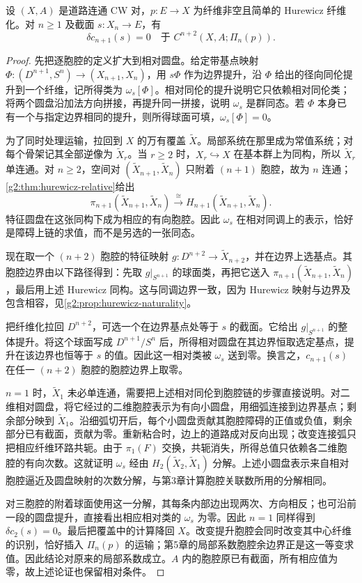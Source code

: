 \begin{lemma}\label{g2:lem:obstruction-cocycle}
	设 \((X,A)\) 是道路连通 CW 对，\(p:E\to X\) 为纤维非空且简单的 Hurewicz 纤维化。对 \(n\ge1\) 及截面 \(s:X_n\to E\)，有
	\[
		\delta c_{n+1}(s)=0\quad\text{于 }C^{n+2}(X,A;\Pi_n(p)).
	\]
\end{lemma}
\begin{proof}
	先把逐胞腔的定义扩大到相对圆盘。给定带基点映射 \(\Phi:(D^{n+1},S^n)\to(X_{n+1},X_n)\)，用 \(s\Phi\) 作为边界提升，沿 \(\Phi\) 给出的径向同伦提升到一个纤维，记所得类为 \(\omega_s[\Phi]\)。相对同伦的提升说明它只依赖相对同伦类；将两个圆盘沿加法方向拼接，再提升同一拼接，说明 \(\omega_s\) 是群同态。若 \(\Phi\) 本身已有一个与指定边界相同的提升，则所得球面可填，\(\omega_s[\Phi]=0\)。

	为了同时处理运输，拉回到 \(X\) 的万有覆盖 \(\widetilde X\)。局部系统在那里成为常值系统；对每个骨架记其全部逆像为 \(\widetilde X_r\)。当 \(r\ge2\) 时，\(X_r\hookrightarrow X\) 在基本群上为同构，所以 \(\widetilde X_r\) 单连通。对 \(n\ge2\)，空间对 \((\widetilde X_{n+1},\widetilde X_n)\) 只附着 \((n+1)\) 胞腔，故为 \(n\) 连通；\cref{g2:thm:hurewicz-relative}给出
	\[
		\pi_{n+1}(\widetilde X_{n+1},\widetilde X_n)\xrightarrow{\cong}
		H_{n+1}(\widetilde X_{n+1},\widetilde X_n).
	\]
	特征圆盘在这张同构下成为相应的有向胞腔。因此 \(\omega_s\) 在相对同调上的表示，恰好是障碍上链的求值，而不是另选的一张同态。

	现在取一个 \((n+2)\) 胞腔的特征映射 \(g:D^{n+2}\to\widetilde X_{n+2}\)，并在边界上选基点。其胞腔边界由以下路径得到：先取 \(g|_{S^{n+1}}\) 的球面类，再把它送入 \(\pi_{n+1}(\widetilde X_{n+1},\widetilde X_n)\)，最后用上述 Hurewicz 同构。这与同调边界一致，因为 Hurewicz 映射与边界及包含相容，见\cref{g2:prop:hurewicz-naturality}。

	把纤维化拉回 \(D^{n+2}\)，可选一个在边界基点处等于 \(s\) 的截面。它给出 \(g|_{S^{n+1}}\) 的整体提升。将这个球面写成 \(D^{n+1}/S^n\) 后，所得相对圆盘在其边界恒取选定基点，提升在该边界也恒等于 \(s\) 的值。因此这一相对类被 \(\omega_s\) 送到零。换言之，\(c_{n+1}(s)\) 在任一 \((n+2)\) 胞腔的胞腔边界上取零。

	\(n=1\) 时，\(\widetilde X_1\) 未必单连通，需要把上述相对同伦到胞腔链的步骤直接说明。对二维相对圆盘，将它经过的二维胞腔表示为有向小圆盘，用细弧连接到边界基点；剩余部分映到 \(\widetilde X_1\)。沿细弧切开后，每个小圆盘贡献其胞腔障碍的正值或负值，剩余部分已有截面，贡献为零。重新粘合时，边上的道路成对反向出现；改变连接弧只把相应纤维环路共轭。由于 \(\pi_1(F)\) 交换，共轭消失，所得总值只依赖各二维胞腔的有向次数。这就证明 \(\omega_s\) 经由 \(H_2(\widetilde X_2,\widetilde X_1)\) 分解。上述小圆盘表示来自相对胞腔逼近及圆盘映射的次数分解，与第3章计算胞腔关联数所用的分解相同。

	对三胞腔的附着球面使用这一分解，其每条内部边出现两次、方向相反；也可沿前一段的圆盘提升，直接看出相应相对类的 \(\omega_s\) 为零。因此 \(n=1\) 同样得到 \(\delta c_2(s)=0\)。最后把覆盖中的计算降回 \(X\)。改变提升胞腔会同时改变其中心纤维的识别，恰好插入 \(\Pi_n(p)\) 的运输；第5章的局部系数胞腔余边界正是这一等变求值。因此结论对原来的局部系数成立。\(A\) 内的胞腔原已有截面，所有相应值为零，故上述论证也保留相对条件。
\end{proof}

